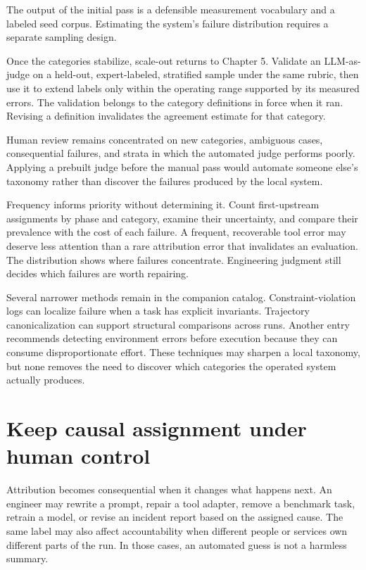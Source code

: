 The output of the initial pass is a defensible measurement vocabulary and a labeled seed corpus. Estimating the system's failure distribution requires a separate sampling design.

Once the categories stabilize, scale-out returns to Chapter 5. Validate an LLM-as-judge on a held-out, expert-labeled, stratified sample under the same rubric, then use it to extend labels only within the operating range supported by its measured errors. The validation belongs to the category definitions in force when it ran. Revising a definition invalidates the agreement estimate for that category.

Human review remains concentrated on new categories, ambiguous cases, consequential failures, and strata in which the automated judge performs poorly. Applying a prebuilt judge before the manual pass would automate someone else's taxonomy rather than discover the failures produced by the local system.

Frequency informs priority without determining it. Count first-upstream assignments by phase and category, examine their uncertainty, and compare their prevalence with the cost of each failure. A frequent, recoverable tool error may deserve less attention than a rare attribution error that invalidates an evaluation. The distribution shows where failures concentrate. Engineering judgment still decides which failures are worth repairing.

Several narrower methods remain in the companion catalog. Constraint-violation logs can localize failure when a task has explicit invariants. Trajectory canonicalization can support structural comparisons across runs. Another entry recommends detecting environment errors before execution because they can consume disproportionate effort. These techniques may sharpen a local taxonomy, but none removes the need to discover which categories the operated system actually produces.

\hypertarget{keep-causal-assignment-under-human-control}{%
\section{Keep causal assignment under human control}\label{keep-causal-assignment-under-human-control}}

Attribution becomes consequential when it changes what happens next. An engineer may rewrite a prompt, repair a tool adapter, remove a benchmark task, retrain a model, or revise an incident report based on the assigned cause. The same label may also affect accountability when different people or services own different parts of the run. In those cases, an automated guess is not a harmless summary.

